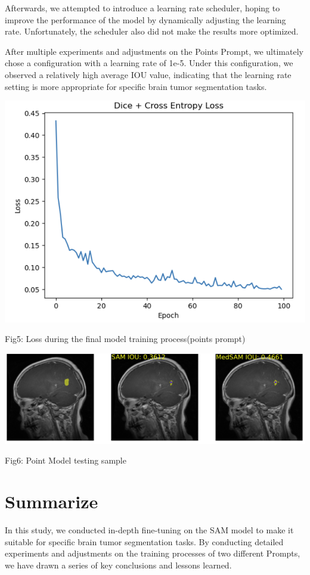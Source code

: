 \documentclass[12pt, a4paper, oneside]{article}
\begin{document}
Afterwards, we attempted to introduce a learning rate scheduler, hoping to improve the performance of the model by dynamically adjusting the learning rate. Unfortunately, the scheduler also did not make the results more optimized.

After multiple experiments and adjustments on the Points Prompt, we ultimately chose a configuration with a learning rate of 1e-5. Under this configuration, we observed a relatively high average IOU value, indicating that the learning rate setting is more appropriate for specific brain tumor segmentation tasks.

\begin{center}
\includegraphics[width=1\textwidth]{6.png}
\caption{Fig5: Loss during the final model training process(points prompt)}
\end{center}

\begin{center}
\includegraphics[width=1\textwidth]{5.png}
\caption{Fig6: Point Model testing sample}
\end{center}

\section{Summarize}
In this study, we conducted in-depth fine-tuning on the SAM model to make it suitable for specific brain tumor segmentation tasks. By conducting detailed experiments and adjustments on the training processes of two different Prompts, we have drawn a series of key conclusions and lessons learned.
\end{document}
